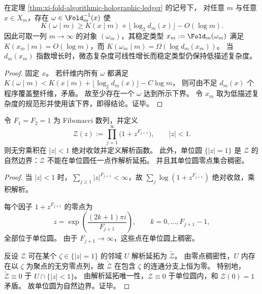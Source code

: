 \begin{corollary}[稳定类型可极简而微态仍可近随机]\label{cor:xi-fold-simple-type-complex-microstate}
在定理 \ref{thm:xi-fold-algorithmic-holographic-ledger} 的记号下，
对任意 \(m\) 与任意 \(x\in X_m\)，存在
\(
\omega\in\Fold_m^{-1}(x)
\)
使
\[
K(\omega\mid m)\ge
K(x\mid m)+\lfloor\log_2 d_m(x)\rfloor-O(\log m).
\]
因此可取一列 \(m\to\infty\) 的对象 \((\omega_m)\)，其稳定类型
\(
x_m:=\Fold_m(\omega_m)
\)
满足 \(K(x_m\mid m)=O(\log m)\)，而
\(
K(\omega_m\mid m)=\Omega(\log d_m(x_m))
\)。
当 \(d_m(x_m)\) 指数增长时，微态复杂度可线性增长而稳定类型仍保持低描述复杂度。
\end{corollary}
\begin{proof}
固定 \(x\)。
若纤维内所有 \(\omega\) 都满足
\(
K(\omega\mid m)<K(x\mid m)+\lfloor\log_2 d_m(x)\rfloor-C\log m
\)，
则可由不足 \(d_m(x)\) 个程序覆盖整纤维，矛盾。
故至少存在一个 \(\omega\) 达到所示下界。
令 \(x_m\) 取为低描述复杂度的规范形并使用该下界，即得结论。证毕。
\end{proof}

\begin{theorem}\label{thm:xi-fibonacci-leyang-natural-boundary}
令 \(F_1=F_2=1\) 为 Fibonacci 数列，并定义
\[
\mathcal Z(z):=\prod_{j=1}^{\infty}\bigl(1+z^{F_{j+1}}\bigr),
\qquad |z|<1.
\]
则无穷乘积在 \(|z|<1\) 绝对收敛并定义解析函数。
此外，单位圆 \(\{|z|=1\}\) 是 \(\mathcal Z\) 的自然边界：\(\mathcal Z\) 不能在单位圆任一点作解析延拓。
并且其单位圆零点集合稠密。
\end{theorem}
\begin{proof}
当 \(|z|<1\) 时，\(\sum_{j\ge 1}|z|^{F_{j+1}}<\infty\)，故
\(
\sum_j\log(1+z^{F_{j+1}})
\)
绝对收敛，乘积解析。

每个因子 \(1+z^{F_{j+1}}\) 的零点为
\[
z=\exp\!\left(\frac{(2k+1)\pi i}{F_{j+1}}\right),\qquad
k=0,\dots,F_{j+1}-1,
\]
全部位于单位圆。
由于 \(F_{j+1}\to\infty\)，这些点在单位圆上稠密。

反设 \(\mathcal Z\) 可在某个 \(\zeta\in\{|z|=1\}\) 的邻域 \(U\) 解析延拓为 \(\widetilde{\mathcal Z}\)。
由零点稠密性，\(U\) 内存在以 \(\zeta\) 为聚点的无穷零点列，故 \(\widetilde{\mathcal Z}\) 在包含 \(\zeta\) 的连通分支上恒为零。
特别地，\(\widetilde{\mathcal Z}\equiv 0\) 于 \(U\cap\{|z|<1\}\)。
由解析延拓唯一性，\(\mathcal Z\equiv 0\) 于单位圆内，和 \(\mathcal Z(0)=1\) 矛盾。
故单位圆为自然边界。证毕。
\end{proof}

